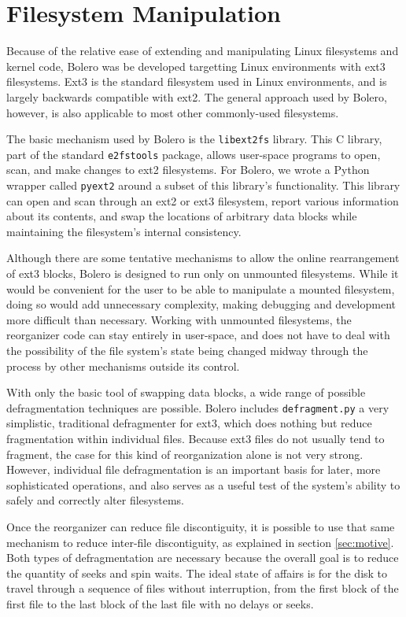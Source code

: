\documentclass[10pt,twocolumn,letterpaper]{article}
\begin{document}
\section{Filesystem Manipulation}

Because of the relative ease of extending and manipulating Linux filesystems and
kernel code, Bolero was be developed targetting Linux environments with ext3
filesystems. Ext3 is the standard filesystem used in Linux
environments, and is largely backwards compatible with ext2\cite{ext2journal}.
The general approach used by Bolero, however, is also applicable to most other commonly-used
filesystems.

The basic mechanism used by Bolero is the \texttt{libext2fs} library. This C
library, part of the standard \texttt{e2fstools} package, allows user-space programs
to open, scan, and make changes to ext2 filesystems. For Bolero, we wrote
a Python wrapper called \texttt{pyext2} around a subset of this library's functionality.
This library can open and scan through an ext2 or ext3 filesystem, report
various information about its contents, and swap the locations of arbitrary data
blocks while maintaining the filesystem's internal consistency.

Although there are some tentative mechanisms to allow the online rearrangement
of ext3 blocks\cite{ext3online}, Bolero is designed to run only on unmounted filesystems.
While it would be
convenient for the user to be able to manipulate a mounted filesystem, doing so
would add unnecessary complexity, making debugging and
development more difficult than necessary. Working with unmounted filesystems,
the reorganizer code can stay entirely in user-space, and does not have
to deal with the possibility of the file system's state being changed
midway through the process by other mechanisms outside its control.

With only the basic tool of swapping data blocks, a wide range of possible
defragmentation techniques are possible. Bolero includes \texttt{defragment.py}
a very simplistic, traditional defragmenter for ext3, which
does nothing but reduce fragmentation within individual files. Because ext3 files do
not usually tend to fragment, the case for this kind of reorganization alone
is not very strong. However, individual file defragmentation is an important
basis for later, more sophisticated operations, and also serves as a useful test
of the system's ability to safely and correctly alter filesystems.

Once the reorganizer can reduce file discontiguity, it is possible to
use that same mechanism to reduce inter-file discontiguity, as explained
in section \ref{sec:motive}. Both types of defragmentation are necessary because the overall goal is to reduce the quantity of seeks and spin waits. The ideal state of affairs is for the disk to travel through
a sequence of files without interruption\cite{autolocality}, from the first block of the first file to the last
block of the last file with no delays or seeks.
\end{document}
